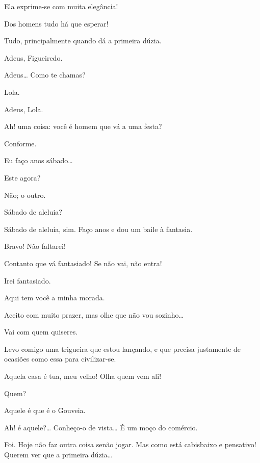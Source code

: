   Ela exprime-se com muita elegância!

 Dos homens tudo há que esperar!

 Tudo, principalmente quando dá a primeira dúzia.

  Adeus, Figueiredo.

 Adeus\ldots{} Como te chamas?

 Lola.

 Adeus, Lola.

  Ah! uma coisa: você é homem que vá a uma festa?

 Conforme.

 Eu faço anos sábado\ldots{}

 Este agora?

 Não; o outro.

 Sábado de aleluia?

 Sábado de aleluia, sim. Faço anos e dou um baile à fantasia.

 Bravo! Não faltarei!

 Contanto que vá fantasiado! Se não vai, não entra!

 Irei fantasiado.

 Aqui tem você a minha morada. 

 Aceito com muito prazer, mas olhe que não vou sozinho\ldots{}

 Vai com quem quiseres.

 Levo comigo uma trigueira que estou lançando, e que precisa
justamente de ocasiões como essa para civilizar-se.

 Aquela casa é tua, meu velho!  Olha quem vem ali!

 Quem?

 Aquele é que é o Gouveia.

 Ah! é aquele?\ldots{} Conheço-o de vista\ldots{} É um moço do comércio.

 Foi. Hoje não faz outra coisa senão jogar. Mas como está cabisbaixo
e pensativo! Querem ver que a primeira dúzia\ldots{}

